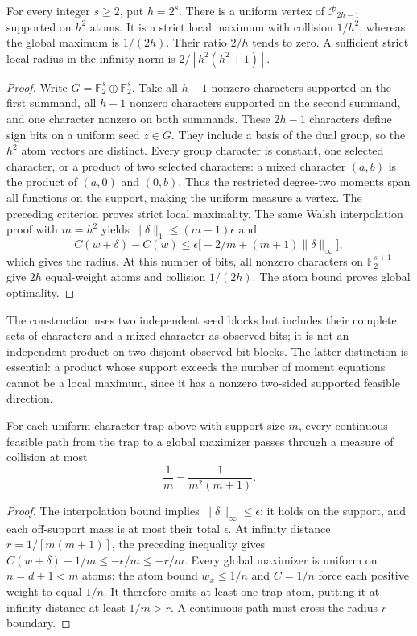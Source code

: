 \begin{theorem}
\label{thm:attainment-infinite-traps}
For every integer $s\ge2$, put $h=2^s$. There is a uniform vertex
of $\mathcal P_{2h-1}$ supported on $h^2$ atoms. It is a strict
local maximum with collision $1/h^2$, whereas the global maximum
is $1/(2h)$. Their ratio $2/h$ tends to zero. A sufficient strict
local radius in the infinity norm is $2/[h^2(h^2+1)]$.
\end{theorem}
\begin{proof}
Write $G=\mathbb F_2^s\oplus\mathbb F_2^s$. Take all $h-1$
nonzero characters supported on the first summand, all $h-1$
nonzero characters supported on the second summand, and one character
nonzero on both summands. These $2h-1$ characters define sign bits
on a uniform seed $z\in G$. They include a basis of the dual group,
so the $h^2$ atom vectors are distinct. Every group character is
constant, one selected character, or a product of two selected
characters: a mixed character $(a,b)$ is the product of $(a,0)$ and
$(0,b)$. Thus the restricted degree-two moments span all functions
on the support, making the uniform measure a vertex.
The preceding criterion proves strict local maximality. The same
Walsh interpolation proof with $m=h^2$ yields
$\|\delta\|_1\le(m+1)\epsilon$ and
\[
 C(w+\delta)-C(w)
 \le\epsilon\big[-2/m+(m+1)\|\delta\|_\infty\big],
\]
which gives the radius. At this number of bits, all nonzero characters
on $\mathbb F_2^{s+1}$ give $2h$ equal-weight atoms and collision
$1/(2h)$. The atom bound proves global optimality.
\end{proof}
The construction uses two independent seed blocks but includes their
complete sets of characters and a mixed character as observed bits;
it is not an independent product on two disjoint observed bit blocks.
The latter distinction is essential: a product whose support exceeds
the number of moment equations cannot be a local maximum, since it
has a nonzero two-sided supported feasible direction.

\begin{corollary}
\label{cor:attainment-barrier}
For each uniform character trap above with support size $m$, every
continuous feasible path from the trap to a global maximizer passes
through a measure of collision at most
\[
 \frac1m-\frac1{m^2(m+1)}.
\]
\end{corollary}
\begin{proof}
The interpolation bound implies $\|\delta\|_\infty\le\epsilon$:
it holds on the support, and each off-support mass is at most their
total $\epsilon$. At infinity distance $r=1/[m(m+1)]$, the preceding
inequality gives $C(w+\delta)-1/m\le-\epsilon/m\le-r/m$.
Every global maximizer is uniform on $n=d+1<m$ atoms: the atom bound
$w_x\le1/n$ and $C=1/n$ force each positive weight to equal $1/n$.
It therefore omits at least one trap atom, putting it at infinity
distance at least $1/m>r$. A continuous path must cross the radius-$r$
boundary.
\end{proof}
